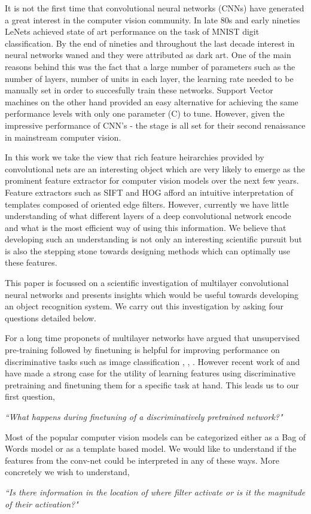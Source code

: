 \documentclass[runningheads]{llncs}
\begin{document}
It is not the first time that convolutional neural networks (CNNs) have generated a great interest in the computer vision community. In late 80s and early nineties LeNets \cite{Lecun89} achieved state of art performance on the task of MNIST digit classification. By the end of nineties and throughout the last decade interest in neural networks waned and they were attributed as dark art. One of the main reasons behind this was the fact that a large number of parameters such as the number of layers, number of units in each layer, the learning rate needed to be manually set in order to succesfully train these networks. Support Vector machines on the other hand provided an easy alternative for achieving the same performance levels with only one parameter (C) to tune. However, given the impressive performance of CNN's - the stage is all set for their second renaissance in mainstream computer vision. 

In this work we take the view that rich feature heirarchies provided by convolutional nets are an interesting object which are very likely to emerge as the prominent feature extractor for computer vision models over the next few years. Feature extractors such as SIFT and HOG afford an intuitive interpretation of templates composed of oriented edge filters. However, currently we have little understanding of what different layers of a deep convolutional network encode and what is the most efficient way of using this information. We believe that developing such an understanding is not only an interesting scientific pursuit but is also the stepping stone towards designing methods which can optimally use these features.  

This paper is focussed on a scientific investigation of multilayer convolutional neural networks and presents insights which would be useful towards developing an object recognition system. We carry out this investigation by asking four questions detailed below.

For a long time proponets of multilayer networks have argued that unsupervised pre-training followed by finetuning is helpful for improving performance on discriminative tasks such as image classification \cite{GoogleCat}, \cite{DeepPre}, \cite{HintonPre}. However recent work of \cite{Decaf} and \cite{Rcnn} have made a strong case for the utility of learning features using discriminative pretraining and finetuning them for a specific task at hand. This leads us to our first question,
\begin{center}
\textit{``What happens during finetuning of a discriminatively pretrained network?"}
\end{center}
Most of the popular computer vision models can be categorized either as a Bag of Words model or as a template based model. We would like to understand if the features from the conv-net could be interpreted in any of these ways. More concretely we wish to understand, 
\begin{center}
\textit{``Is there information in the location of where filter activate or is it the magnitude of their activation?"}
\end{center}
\end{document}
